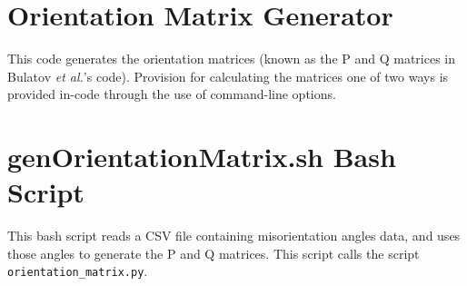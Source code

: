 \documentclass[twoside,senior]{BYUPhys}
\begin{document}
\chapter{Orientation Matrix Generator\label{app:OrientationMatrix}}
This code generates the orientation matrices (known as the P and Q matrices in Bulatov \emph{et al.}'s code). Provision for calculating the matrices one of two ways is provided in-code through the use of command-line options.



\chapter{genOrientationMatrix.sh Bash Script\label{app:genOrientationMatrix}}
This bash script reads a CSV file containing misorientation angles data, and uses those angles to generate the P and Q matrices.  This script calls the script \lstinline!orientation_matrix.py!.






 \cleardoublepage
 \singlespace
 \printindex
\end{document}
